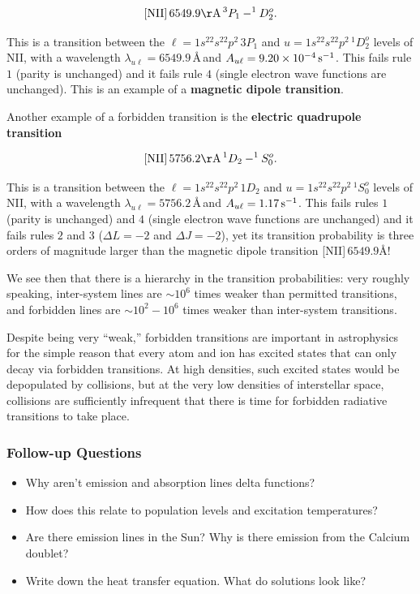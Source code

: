 \documentclass[a4paper,10pt]{article}
\begin{document}
\begin{align*}
    {\rm [NII]}\,6549.9{\rm \AA}\,^3P_1-^1D_2^o.
\end{align*}

{\noindent}This is a transition between the $\ell=1s^22s^22p^2\,3P_1$ and $u=1s^22s^22p^2\,^1D_2^o$ levels of NII, with a wavelength $\lambda_{u\ell}=6549.9$\,\AA\,and $A_{u\ell}=9.20\times10^{-4}\,{\rm s^{-1}}$. This fails rule $1$ (parity is unchanged) and it fails rule $4$ (single electron wave functions are unchanged). This is an example of a \textbf{magnetic dipole transition}.

{\noindent}Another example of a forbidden transition is the \textbf{electric quadrupole transition}

\begin{align*}
    {\rm [NII]}\,5756.2{\rm \AA}\,^1D_2-^1S_0^o.
\end{align*}

{\noindent}This is a transition between the $\ell=1s^22s^22p^2\,1D_2$ and $u=1s^22s^22p^2\,^1S_0^o$ levels of NII, with a wavelength $\lambda_{u\ell}=5756.2$\,\AA\,and $A_{u\ell}=1.17\,{\rm s^{-1}}$. This fails rules $1$ (parity is unchanged) and $4$ (single electron wave functions are unchanged) and it fails rules $2$ and $3$ ($\Delta L=-2$ and $\Delta J=-2$), yet its transition probability is three orders of magnitude larger than the magnetic dipole transition [NII]\,$6549.9$\AA!

{\noindent}We see then that there is a hierarchy in the transition probabilities: very roughly speaking, inter-system lines are $\sim10^6$ times weaker than permitted transitions, and forbidden lines are $\sim10^2-10^6$ times weaker than inter-system transitions.

{\noindent}Despite being very ``weak,'' forbidden transitions are important in astrophysics for the simple reason that every atom and ion has excited states that can only decay via forbidden transitions. At high densities, such excited states would be depopulated by collisions, but at the very low densities of interstellar space, collisions are sufficiently infrequent that there is time for forbidden radiative transitions to take place.

\subsubsection{Follow-up Questions}

\begin{itemize}
    \item Why aren't emission and absorption lines delta functions?
    \item How does this relate to population levels and excitation temperatures?
    \item Are there emission lines in the Sun? Why is there emission from the Calcium doublet?
    \item Write down the heat transfer equation. What do solutions look like?
\end{itemize}
\end{document}

